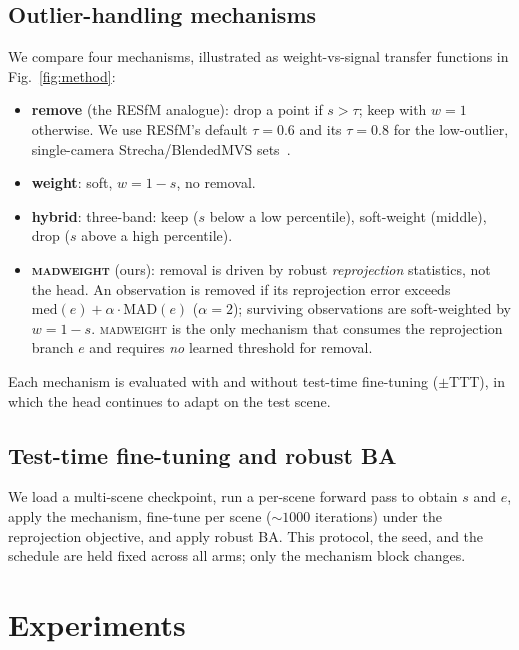 \documentclass[10pt,twocolumn,letterpaper]{article}
\newcommand{\mad}{\textsc{madweight}}
\begin{document}
\subsection{Outlier-handling mechanisms}
We compare four mechanisms, illustrated as weight-vs-signal transfer functions in
Fig.~\ref{fig:method}:
\begin{itemize}\itemsep2pt
\item\textbf{remove} (the RESfM analogue): drop a point if $s>\tau$; keep with $w{=}1$
otherwise. We use RESfM's default $\tau{=}0.6$ and its $\tau{=}0.8$ for the low-outlier,
single-camera Strecha/BlendedMVS sets~\cite{resfm}.
\item\textbf{weight}: soft, $w=1-s$, no removal.
\item\textbf{hybrid}: three-band: keep ($s$ below a low percentile), soft-weight (middle),
drop ($s$ above a high percentile).
\item\textbf{\mad{}} (ours): removal is driven by robust \emph{reprojection} statistics, not
the head. An observation is removed if its reprojection error exceeds
$\mathrm{med}(e)+\alpha\cdot\mathrm{MAD}(e)$ ($\alpha{=}2$); surviving observations are
soft-weighted by $w=1-s$. \mad{} is the only mechanism that consumes the reprojection
branch $e$ and requires \emph{no} learned threshold for removal.
\end{itemize}
Each mechanism is evaluated with and without test-time fine-tuning ($\pm$TTT), in which the
head continues to adapt on the test scene.

\subsection{Test-time fine-tuning and robust BA}
We load a multi-scene checkpoint, run a per-scene forward pass to obtain $s$ and $e$, apply
the mechanism, fine-tune per scene ($\sim\!1000$ iterations) under the reprojection
objective, and apply robust BA. This protocol, the seed, and the schedule are held fixed
across all arms; only the mechanism block changes.

\section{Experiments}
\end{document}
